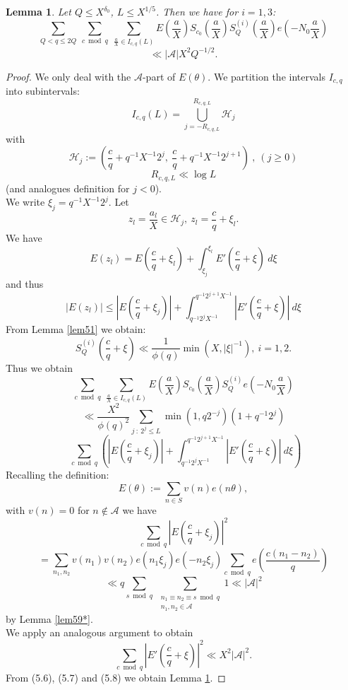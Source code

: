 \documentclass{amsart}
\newtheorem{lemma}[theorem]{Lemma}
\numberwithin{equation}{subsection}
\begin{document}
\begin{lemma}\label{lem515*}
Let $Q\leq X^{\delta_0}$, $L\leq X^{1/5}$. Then we have for $i=1, 3$:
$$\sum_{Q< q\leq 2Q}\ \sum_{c \bmod q}\ \sum_{\frac{a}{X}\in I_{c,q}(L)} E\left(\frac{a}{X}\right) S_{c_0}\left(\frac{a}{X}\right) S_Q^{(i)}\left(\frac{a}{X}\right) e\left(-N_0\frac{a}{X}\right)$$ 
$$\ll |\mathcal{A}| X^2 Q^{-1/2}.$$
\end{lemma}
\begin{proof}
We only deal with the $\mathcal{A}$-part of $E(\theta)$. We partition the intervals $I_{c,q}$ into subintervals:
$$I_{c,q}(L)=\bigcup_{j=-R_{c,q,L}}^{R_{c,q,L}}\mathcal{H}_j$$
with 
$$\mathcal{H}_j:=\left(\frac{c}{q}+q^{-1}X^{-1}2^j,\ \frac{c}{q}+q^{-1}X^{-1}2^{j+1}\right)\:,\ (j\geq 0)$$
$$R_{c,q,L}\ll \log L$$
(and analogues definition for $j<0$).\\
We write $\xi_j=q^{-1}X^{-1} 2^j$. Let 
$$z_l=\frac{a_l}{X}\in \mathcal{H}_j,\ z_l=\frac{c}{q}+\xi_l.$$
We have 
$$E(z_l)=E\left(\frac{c}{q}+\xi_l\right)+\int_{\xi_j}^{\xi_l} E'\left(\frac{c}{q}+\xi\right)\: d\xi$$
and thus 
$$|E(z_l)|\leq \left|E\left(\frac{c}{q}+\xi_j\right)\right|+\int_{q^{-1}2^j X^{-1}}^{q^{-1}2^{j+1}X^{-1}} \left|E'\left(\frac{c}{q}+\xi\right)\right|\: d\xi$$
From Lemma \ref{lem51} we obtain:
$$S_Q^{(i)}\left(\frac{c}{q}+\xi\right)\ll \frac{1}{\phi(q)} \min(X, |\xi|^{-1}),\ i=1, 2.$$
Thus we obtain
\[
\sum_{c \bmod q}\ \sum_{\frac{a}{X}\in I_{c,q}(L)} E\left(\frac{a}{X}\right) S_{c_0}\left(\frac{a}{X}\right) S_Q^{(i)} e\left(-N_0\frac{a}{X}\right) \tag{5.6}
\]
$$\ll \frac{X^2}{\phi(q)^2} \sum_{j\::\: 2^j\leq L} \min(1, q2^{-j})(1+q^{-1}2^j)$$
$$\ \ \sum_{c \bmod q}\left(  \left|E\left(\frac{c}{q}+\xi_j\right)\right|  +\int_{q^{-1}2^j X^{-1}}^{q^{-1}2^{j+1}X^{-1}} \left|E'\left(\frac{c}{q}+\xi\right)\right|\: d\xi \right)$$
Recalling the definition:
$$E(\theta):=\sum_{n\in S} v(n)e(n\theta),$$
with $v(n)=0$ for $n\not\in\mathcal{A}$ we have
\[
\sum_{c\bmod q} \left| E\left(\frac{c}{q}+\xi_j\right)\right|^2  \tag{5.7}
\]
$$=\sum_{n_1, n_2} v(n_1)v(n_2) e(n_1\xi_j) e(-n_2\xi_j)\sum_{c \bmod q} e\left( \frac{c(n_1-n_2)}{q} \right)$$
$$\ll q\sum_{s \bmod q}\ \sum_{\substack{n_1\equiv n_2 \equiv s \bmod q \\ n_1, n_2\in \mathcal{A}}} 1 \ll |\mathcal{A}|^2$$
by Lemma \ref{lem59*}.\\
We apply an analogous argument to obtain 
\[
\sum_{c \bmod q} \left| E'\left(\frac{c}{q}+\xi\right)\right|^2 \ll X^2|\mathcal{A}|^2.  \tag{5.8}
\]
From (5.6), (5.7) and (5.8) we obtain Lemma \ref{lem515*}.
\end{proof}
\end{document}
